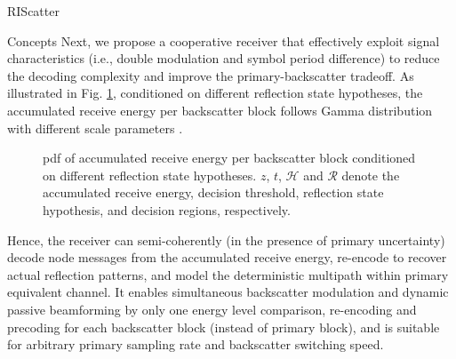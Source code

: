 \documentclass[journal]{IEEEtran}
\begin{document}
\begin{section}{RIScatter}
\begin{subsection}{Concepts}
		Next, we propose a cooperative receiver that effectively exploit signal characteristics (i.e., double modulation and symbol period difference) to reduce the decoding complexity and improve the primary-backscatter tradeoff.
		As illustrated in Fig. \ref{fg:energy_distribution}, conditioned on different reflection state hypotheses, the accumulated receive energy per backscatter block follows Gamma distribution with different scale parameters \cite{Qian2017b}.
		\begin{figure}[!t]
			\centering
			\resizebox{0.9\columnwidth}{!}{
				
			}
			\caption{
				\gls{pdf} of accumulated receive energy per backscatter block conditioned on different reflection state hypotheses.
				$z$, $t$, $\mathcal{H}$ and $\mathcal{R}$ denote the accumulated receive energy, decision threshold, reflection state hypothesis, and decision regions, respectively.
			}
			\label{fg:energy_distribution}
		\end{figure}
		Hence, the receiver can semi-coherently (in the presence of primary uncertainty) decode node messages from the accumulated receive energy, re-encode to recover actual reflection patterns, and model the deterministic multipath within primary equivalent channel.
		It enables simultaneous backscatter modulation and dynamic passive beamforming by only one energy level comparison, re-encoding and precoding for each backscatter block (instead of primary block), and is suitable for arbitrary primary sampling rate and backscatter switching speed.
	\end{subsection}



\end{section}
\end{document}

